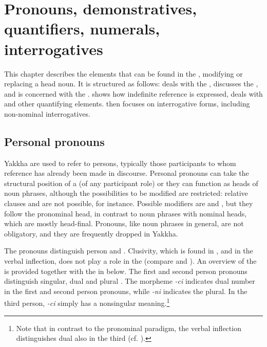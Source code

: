 \chapter{Pronouns, demonstratives, quantifiers, numerals, interrogatives}\label{ch-pron}
  
This chapter describes the elements that can be found in the ,  mo\-di\-fying or replacing a head noun. It is structured as follows:  deals with the ,  discusses the , and  is concerned with the .  shows how indefinite reference is expressed,  deals with  and other quantifying elements.  then focuses on interrogative forms, including non-nominal interrogatives. 
  
\section{Personal pronouns}\label{pers-pron}

Yakkha  are used to refer to persons, typically those participants to whom reference has already been made in discourse. Personal pronouns can take the structural position of a  (of any participant role) or they can function as  heads of noun phrases, although the possibilities to be modified are restricted: relative clauses and  are not possible, for instance. Possible modifiers are  and , but they follow the pronominal head, in contrast to noun phrases with nominal heads, which are mostly head-final. Pronouns, like noun phrases in general, are not obligatory, and they are frequently dropped in Yakkha.

The pronouns distinguish person and . Clusivity, which is found  in ,  and in the verbal inflection,  does not play a role in the  (compare \Next[a] and \Next[b]). An overview of the  is provided together with the  in  below. The first and second person pronouns distinguish singular, dual and plural . The morpheme \emph{-ci} indicates dual number in the first and second person pronouns, while \emph{-ni} indicates the plural. In the third person, \emph{-ci} simply has a nonsingular meaning.\footnote{Note that in contrast to the pronominal paradigm, the verbal inflection distinguishes dual  also in the third  (cf.  ).} 



